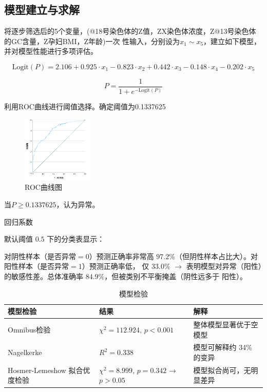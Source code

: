 \documentclass[withoutpreface,notoc]{cumcmthesis}
\begin{document}
	\subsection{模型建立与求解}

	将逐步筛选后的5个变量，(@18号染色体的Z值，ZX染色体浓度，Z@13号染色体的GC含量，Z孕妇BMI，Z年龄)一次
	性输入，分别设为$\displaystyle x_{1}\sim x_{5}$，建立如下模型，并对模型性能进行多项评估。

	\begin{equation*}
	\label{logit}
	\text{Logit}(P) = 2.106 + 0.925 \cdot x_{1} - 0.823 \cdot x_{2} + 0.442 \cdot x_{3} - 0.148 \cdot x_{4} - 0.202 \cdot x_{5}
	\end{equation*}

	\begin{equation*}
	P = \frac{1}{1 + e^{-\mathrm{Logit}(P)}}
	\end{equation*}


	利用ROC曲线进行阈值选择。确定阈值为0.1337625
	\begin{figure}[ht]
		\centering
		\includegraphics[width=0.3\textwidth]{figures/ROC曲线.png} 
		\caption{ROC曲线图}
		\label{ROC曲线}
	\end{figure}

	当$P\geq0.1337625 $，认为异常。


	回归系数


	默认阈值 $0.5$ 下的分类表显示：

	对阴性样本（是否异常$=0$）预测正确率非常高 $97.2\%$（但阴性样本占比大）。对阳性样本（是否异常$=1$）预测正确率低，
	仅 $33.0\%$ $\rightarrow$ 表明模型对异常（阳性）的敏感性差。总体准确率 $84.9\%$，但被类别不平衡掩盖（阴性远多于
	阳性）。

	

	\begin{table}[!ht]
		\centering
		\caption{模型检验}
		\label{模型检验}
		\begin{tabular}{|l|l|l|}
		\hline
			模型检验 & 结果 & 解释 \\ \hline
			Omnibus检验 & $\chi^2 = 112.924$, $p < 0.001$ & 整体模型显著优于空模型 \\ \hline
			Nagelkerke & $R^2 = 0.338$ & 模型可解释约 34\% 的变异 \\ \hline
			Hosmer-Lemeshow 拟合优度检验 & $\chi^2 = 8.999$, $p = 0.342$ → $p > 0.05$ & 模型拟合尚可，无明显差异\\ \hline
		\end{tabular}
	\end{table}
\end{document}
